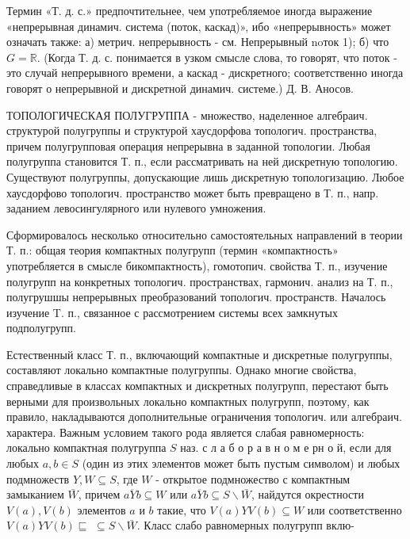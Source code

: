 \documentclass[10pt]{article}
\begin{document}
Термин «Т. д. с.» предпочтительнее, чем употребляемое иногда выражение «непрерывная динамич. система (поток, каскад)», ибо «непрерывность» может означать также: а) метрич. непрерывность - см. Непрерывный noток 1); б) что $G=\mathbb{R}$. (Когда Т. д. с. понимается в узком смысле слова, то говорят, что поток - это случай непрерывного времени, а каскад - дискретного; соответственно иногда говорят о непрерывной и дискретной динамич. системе.) Д. В. Аносов.



ТОПОЛОГИЧЕСКАЯ ПОЛУГРУППА - множество, наделенное алгебраич. структурой полугруппы и структурой хаусдорфова топологич. пространства, причем полугрупповая операция непрерывна в заданной топологии. Любая полугруппа становится Т. п., если рассматривать на ней дискретную топологию. Существуют полугруппы, допускающие лишь дискретную топологизацию. Любое хаусдорфово топологич. пространство может быть превращено в Т. п., напр. заданием левосингулярного или нулевого умножения.



Сформировалось несколько относительно самостоятельных направлений в теории Т. п.: общая теория компактных полугрупп (термин «компактность» употребляется в смысле бикомпактность), гомотопич. свойства Т. п., изучение полугрупп на конкретных топологич. пространствах, гармонич. анализ на Т. п., полугрушшы непрерывных преобразований топологич. пространств. Началось изучение T. п., связанное с рассмотрением системы всех замкнутых подполугрупп.



Естественный класс Т. п., включающий компактные и дискретные полугруппы, составляют локально компактные полугруппы. Однако многие свойства, справедливые в классах компактных и дискретных полугрупп, перестают быть верными для произвольных локально компактных полугрупп, поэтому, как правило, накладываются дополнительные ограничения топологич. или алгебраич. характера. Важным условием такого рода является слабая равномерность: локально компактная полугруппа $S$ наз. с л а б о р а в н о м е рн о й, если для любых $a, b \in S$ (один из этих элементов может быть пустым символом) и любых подмножеств $Y, W \subseteq S$, где $W$ - открытое подмножество с компактным замыканием $\bar{W}$, причем $\overline{a Y b} \subseteq W$ или $\overline{a Y b} \subseteq S \backslash \bar{W}$, найдутся окрестности $V(a), V(b)$ элементов $a$ и $b$ такие, что $V(a) Y V(b) \subseteq W$ или соответственно $V(a) Y V(b) \sqsubseteq$ $\subseteq S \backslash \bar{W}$. Класс слабо равномерных полугрупп вклю-
\end{document}
